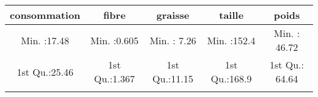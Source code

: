 \documentclass[
]{article}
\begin{document}
\begin{longtable}[]{@{}ccccc@{}}
\toprule
\begin{minipage}[b]{0.17\columnwidth}\centering
consommation\strut
\end{minipage} & \begin{minipage}[b]{0.17\columnwidth}\centering
fibre\strut
\end{minipage} & \begin{minipage}[b]{0.17\columnwidth}\centering
graisse\strut
\end{minipage} & \begin{minipage}[b]{0.17\columnwidth}\centering
taille\strut
\end{minipage} & \begin{minipage}[b]{0.18\columnwidth}\centering
poids\strut
\end{minipage}\tabularnewline
\midrule
\endhead
\begin{minipage}[t]{0.17\columnwidth}\centering
Min. :17.48\strut
\end{minipage} & \begin{minipage}[t]{0.17\columnwidth}\centering
Min. :0.605\strut
\end{minipage} & \begin{minipage}[t]{0.17\columnwidth}\centering
Min. : 7.26\strut
\end{minipage} & \begin{minipage}[t]{0.17\columnwidth}\centering
Min. :152.4\strut
\end{minipage} & \begin{minipage}[t]{0.18\columnwidth}\centering
Min. : 46.72\strut
\end{minipage}\tabularnewline
\begin{minipage}[t]{0.17\columnwidth}\centering
1st Qu.:25.46\strut
\end{minipage} & \begin{minipage}[t]{0.17\columnwidth}\centering
1st Qu.:1.367\strut
\end{minipage} & \begin{minipage}[t]{0.17\columnwidth}\centering
1st Qu.:11.15\strut
\end{minipage} & \begin{minipage}[t]{0.17\columnwidth}\centering
1st Qu.:168.9\strut
\end{minipage} & \begin{minipage}[t]{0.18\columnwidth}\centering
1st Qu.: 64.64\strut
\end{minipage}\tabularnewline
\begin{minipage}[t]{0.17\columnwidth}\centering

\end{minipage}
\end{longtable}
\end{document}

